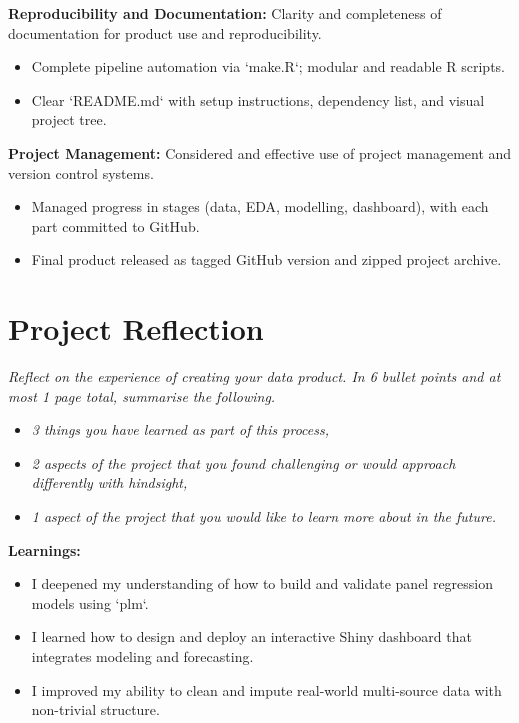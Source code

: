 \documentclass[a4paper, 12pt]{article}
\begin{document}
\textbf{Reproducibility and Documentation:} Clarity and completeness of documentation for product use and reproducibility.

\begin{itemize}
    \item Complete pipeline automation via `make.R`; modular and readable R scripts.
    \item Clear `README.md` with setup instructions, dependency list, and visual project tree.
\end{itemize}

\textbf{Project Management:} Considered and effective use of project management and version control systems.

\begin{itemize}
    \item Managed progress in stages (data, EDA, modelling, dashboard), with each part committed to GitHub.
    \item Final product released as tagged GitHub version and zipped project archive.
\end{itemize}

\pagebreak

\section{Project Reflection}

\textit{Reflect on the experience of creating your data product. In 6 bullet points and at most 1 page total, summarise the following.} 

\begin{itemize}
    \item \textit{3 things you have learned as part of this process,}
    \item \textit{2 aspects of the project that you found challenging or would approach differently with hindsight,} 
    \item \textit{1 aspect of the project that you would like to learn more about in the future.}
\end{itemize}

\textbf{Learnings:}

\begin{itemize}
    \item I deepened my understanding of how to build and validate panel regression models using `plm`.
    \item I learned how to design and deploy an interactive Shiny dashboard that integrates modeling and forecasting.
    \item I improved my ability to clean and impute real-world multi-source data with non-trivial structure.
\end{itemize}
\end{document}
